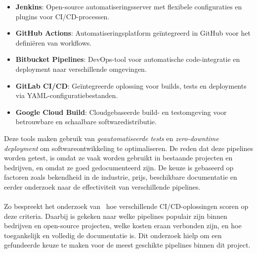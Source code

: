 \begin{itemize}
    \item \textbf{Jenkins}: Open-source automatiseringsserver met flexibele configuraties en plugins voor CI/CD-processen.
    \item \textbf{GitHub Actions}: Automatiseringsplatform geïntegreerd in GitHub voor het definiëren van workflows.
    \item \textbf{Bitbucket Pipelines}: DevOps-tool voor automatische code-integratie en deployment naar verschillende omgevingen.
    \item \textbf{GitLab CI/CD}: Geïntegreerde oplossing voor builds, tests en deployments via YAML-configuratiebestanden.
    \item \textbf{Google Cloud Build}: Cloudgebaseerde build- en testomgeving voor betrouwbare en schaalbare softwaredistributie.
\end{itemize}

Deze tools maken gebruik van \textit{geautomatiseerde tests} en \textit{zero-downtime deployment} om softwareontwikkeling te optimaliseren. De reden dat deze pipelines worden getest, is omdat ze vaak worden gebruikt in bestaande projecten en bedrijven, en omdat ze goed gedocumenteerd zijn. De keuze is gebaseerd op factoren zoals bekendheid in de industrie, prijs, beschikbare documentatie en eerder onderzoek naar de effectiviteit van verschillende pipelines.
\\\\
Zo bespreekt het onderzoek van~\cite{virtanen2021} hoe verschillende CI/CD-oplossingen scoren op deze criteria. Daarbij is gekeken naar welke pipelines populair zijn binnen bedrijven en open-source projecten, welke kosten eraan verbonden zijn, en hoe toegankelijk en volledig de documentatie is. Dit onderzoek hielp om een gefundeerde keuze te maken voor de meest geschikte pipelines binnen dit project.

